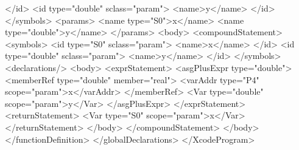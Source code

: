 \begin{XcodeMLExample}
        </id>
        <id type="double" sclass="param">
          <name>y</name>
        </id>
      </symbols>
      <params>
        <name type="S0">x</name>
        <name type="double">y</name>
      </params>
      <body>
        <compoundStatement>
          <symbols>
            <id type="S0" sclass="param">
              <name>x</name>
            </id>
            <id type="double" sclass="param">
              <name>y</name>
            </id>
          </symbols>
          <declarations/>
          <body>
            <exprStatement>
              <asgPlusExpr type="double">
                <memberRef type="double" member="real">
                  <varAddr type="P4" scope="param">x</varAddr>
                </memberRef>
                <Var type="double" scope="param">y</Var>
              </asgPlusExpr>
            </exprStatement>
            <returnStatement>
              <Var type="S0" scope="param">x</Var>
            </returnStatement>
          </body>
        </compoundStatement>
      </body>
    </functionDefinition>
  </globalDeclarations>
</XcodeProgram>
\end{XcodeMLExample}


